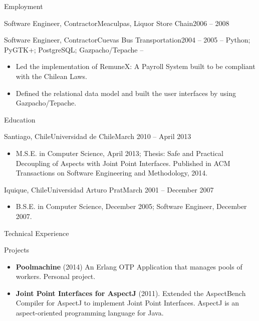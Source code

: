 \documentclass[]{mcdowellcv}
\begin{document}
\begin{cvsection}{Employment}
\begin{cvsubsection}{Software Engineer, Contractor}{Meaculpas, Liquor Store Chain}{2006 -- 2008}
\begin{itemize}
			\end{itemize}
		\end{cvsubsection}
		\begin{cvsubsection}{Software Engineer, Contractor}{Cuevas Bus Transportation}{2004 -- 2005}
			-- Python; PyGTK+; PostgreSQL; Gazpacho/Tepache --
			\begin{itemize}
				\item Led the implementation of RemuneX: A Payroll System built to be compliant with the Chilean Laws.
				\item Defined the relational data model and built the user interfaces by using Gazpacho/Tepache.
			\end{itemize}
		\end{cvsubsection}
	\end{cvsection}
	
	\begin{cvsection}{Education}
		\begin{cvsubsection}{Santiago, Chile}{Universidad de Chile}{March 2010 --  April 2013}
			\begin{itemize}
				\item M.S.E. in Computer Science, April 2013; Thesis: Safe and Practical Decoupling of Aspects with Joint Point Interfaces. Published in ACM Transactions on Software Engineering and Methodology, 2014.
			\end{itemize}
		\end{cvsubsection}
		\begin{cvsubsection}{Iquique, Chile}{Universidad Arturo Prat}{March 2001 --  December 2007}
			\begin{itemize}
				\item B.S.E. in Computer Science, December 2005; Software Engineer, December 2007.
			\end{itemize}
		\end{cvsubsection}
	\end{cvsection}
	
	\begin{cvsection}{Technical Experience}
		\begin{cvsubsection}{Projects}{}{}
			\begin{itemize}
				\item \textbf{Poolmachine} (2014) An Erlang OTP Application that manages pools of workers. Personal project.
				\item \textbf{Joint Point Interfaces for AspectJ} (2011). Extended the AspectBench Compiler for AspectJ to implement Joint Point Interfaces. AspectJ is an aspect-oriented programming language for Java.
			\end{itemize}
		\end{cvsubsection}
	\end{cvsection}
	
\end{document}
